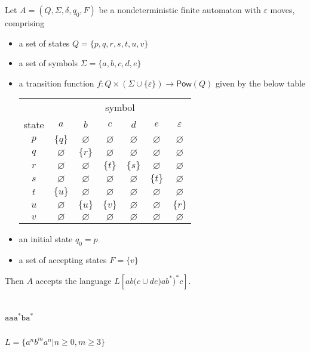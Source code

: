 \documentclass[10pt]{article} %
\begin{document}
Let $A=(Q,\Sigma,\delta,q_0,F)$ be a nondeterministic finite automaton with $\varepsilon$ moves, comprising
\begin{itemize}
	\item a set of states $Q=\{p,q,r,s,t,u,v\}$
	\item a set of symbols $\Sigma = \{a,b,c,d,e\}$
	\item a transition function $f:Q \times (\Sigma \cup \{\varepsilon \}) \to \mathsf{Pow}(Q)$ given by the below table
	
	\begin{tabular}{c|c c c c c c}
		&  \multicolumn{6}{c}{symbol} \\
		state & $a$ & $b$ & $c$ & $d$ &$e$ & $\varepsilon$ \\
		\hline
		$p$ & $\{q\}$ & $\varnothing$ & $\varnothing$ & $\varnothing$ & $\varnothing$ & $\varnothing$\\
		$q$ & $\varnothing$ & $\{r\}$ & $\varnothing$ & $\varnothing$ & $\varnothing$ & $\varnothing$\\
		$r$ & $\varnothing$ & $\varnothing$ & $\{t\}$ & $\{s\}$ & $\varnothing$ & $\varnothing$\\
		$s$ & $\varnothing$ & $\varnothing$ & $\varnothing$ & $\varnothing$ & $\{t\}$ & $\varnothing$\\
		$t$ & $\{u\}$ & $\varnothing$ & $\varnothing$ & $\varnothing$ & $\varnothing$ & $\varnothing$\\
		$u$ & $\varnothing$ & $\{u\}$ & $\{v\}$ & $\varnothing$ & $\varnothing$ & $\{r\}$\\
		$v$ & $\varnothing$ & $\varnothing$ & $\varnothing$ & $\varnothing$ & $\varnothing$ & $\varnothing$\\
	\end{tabular}
	\item an initial state $q_0 = p$
	\item a set of accepting states $F = \{v\}$
\end{itemize}
Then $A$ accepts the language $L[ab\big(c\cup de)ab^*\big)^*c]$.
\section{}
\subsection{}
$\mathtt{aaa^*ba^*}$
\subsection{}
$L = \{a^n b^m a^n|n\geq0,m\geq3\}$
\end{document}
